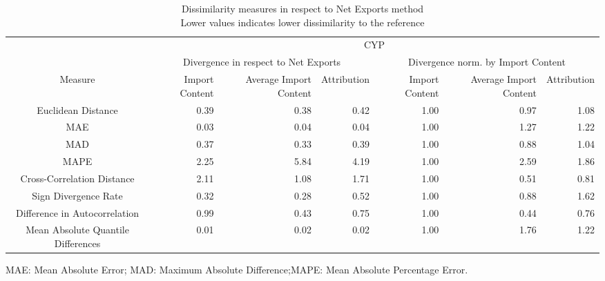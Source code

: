 \begin{table}[t]
\caption*{
{\large Dissimilarity measures in respect to Net Exports method} \\ 
{\small Lower values indicates lower dissimilarity to the reference}
} 
\fontsize{15.0pt}{18.0pt}\selectfont
\begin{tabular*}{\linewidth}{@{\extracolsep{\fill}}crrrrrr}
\toprule
 & \multicolumn{6}{c}{CYP} \\ 
\cmidrule(lr){2-7}
 & \multicolumn{3}{c}{Divergence in respect to Net Exports} & \multicolumn{3}{c}{Divergence norm. by Import Content} \\ 
\cmidrule(lr){2-4} \cmidrule(lr){5-7}
Measure & Import Content & Average Import Content & Attribution & Import Content & Average Import Content & Attribution \\ 
\midrule\addlinespace[2.5pt]
Euclidean Distance & 0.39 & 0.38 & 0.42 & 1.00 & 0.97 & 1.08 \\ 
MAE & 0.03 & 0.04 & 0.04 & 1.00 & 1.27 & 1.22 \\ 
MAD & 0.37 & 0.33 & 0.39 & 1.00 & 0.88 & 1.04 \\ 
MAPE & 2.25 & 5.84 & 4.19 & 1.00 & 2.59 & 1.86 \\ 
Cross-Correlation Distance & 2.11 & 1.08 & 1.71 & 1.00 & 0.51 & 0.81 \\ 
Sign Divergence Rate & 0.32 & 0.28 & 0.52 & 1.00 & 0.88 & 1.62 \\ 
Difference in Autocorrelation & 0.99 & 0.43 & 0.75 & 1.00 & 0.44 & 0.76 \\ 
Mean Absolute Quantile Differences & 0.01 & 0.02 & 0.02 & 1.00 & 1.76 & 1.22 \\ 
\bottomrule
\end{tabular*}
\begin{minipage}{\linewidth}
MAE: Mean Absolute Error; MAD: Maximum Absolute Difference;MAPE: Mean Absolute Percentage Error.\\
\end{minipage}
\end{table}

